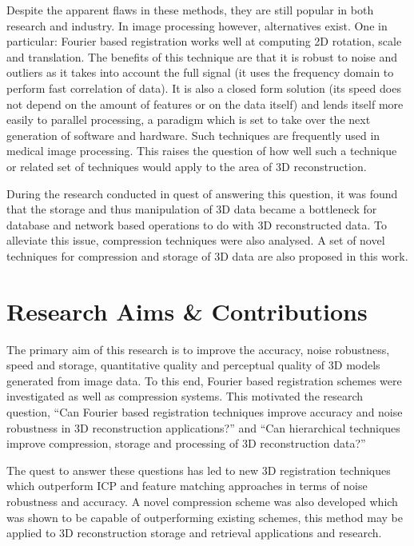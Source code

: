Despite the apparent flaws in these methods, they are still popular in both research and industry. In image processing however, alternatives exist. One in particular: Fourier based registration works well at computing 2D rotation, scale and translation. The benefits of this technique are that it is robust to noise and outliers as it takes into account the full signal (it uses the frequency domain to perform fast correlation of data). It is also a closed form solution (its speed does not depend on the amount of features or on the data itself) and lends itself more easily to parallel processing, a paradigm which is set to take over the next generation of software and hardware. Such techniques are frequently used in medical image processing. This raises the question of how well such a technique or related set of techniques would apply to the area of 3D reconstruction.

During the research conducted in quest of answering this question, it was found that the storage and thus manipulation of 3D data became a bottleneck for database and network based operations to do with 3D reconstructed data. To alleviate this issue, compression techniques were also analysed. A set of novel techniques for compression and storage of 3D data are also proposed in this work.  

\section{Research Aims \& Contributions}

The primary aim of this research is to improve the accuracy, noise robustness, speed and storage, quantitative quality and perceptual quality of 3D models generated from image data. To this end, Fourier based registration schemes were investigated as well as compression systems. This motivated the research question, ``Can Fourier based registration techniques improve accuracy and noise robustness in 3D reconstruction applications?'' and ``Can hierarchical techniques improve compression, storage and processing of 3D reconstruction data?'' 

The quest to answer these questions has led to new 3D registration techniques \cite{Lincoln16Fourier,Lincoln16Dense,Lincoln16Monocular} which outperform ICP and feature matching approaches in terms of noise robustness and accuracy. A novel compression scheme was also developed \cite{Lincoln13Interpolating,Lincoln15Plane} which was shown to be capable of outperforming existing schemes, this method may be applied to 3D reconstruction storage and retrieval applications and research.


